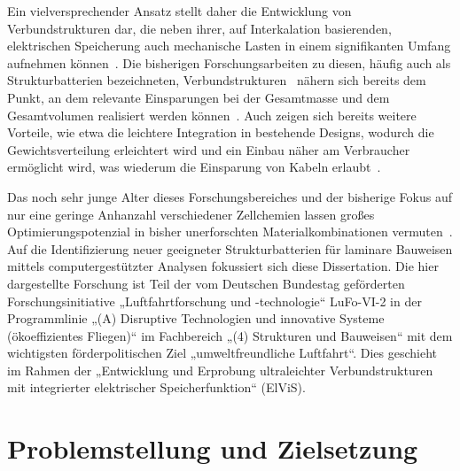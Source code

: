 Ein vielversprechender Ansatz stellt daher die Entwicklung von Verbundstrukturen dar, die neben ihrer, auf Interkalation basierenden, elektrischen Speicherung auch mechanische Lasten in einem signifikanten Umfang aufnehmen können~\cite{Wong2007,Carlson2013}. Die bisherigen Forschungsarbeiten zu diesen, häufig auch als Strukturbatterien bezeichneten, Verbundstrukturen~\cite{Johannisson2018,Liu2009,Ekstedt2010,Wang2019,Zhao2020,Yin2020,Lutkenhaus2020,Fu2021,Jin2021,Kalnaus2021} nähern sich bereits dem Punkt, an dem relevante Einsparungen bei der Gesamtmasse und dem Gesamtvolumen realisiert werden können~\cite{Wetzel2004,Snyder2015,Carlstedt2020a,Asp2014,Johannisson2019}. Auch zeigen sich bereits weitere Vorteile, wie etwa die leichtere Integration in bestehende Designs, wodurch die Gewichtsverteilung erleichtert wird und ein Einbau näher am Verbraucher ermöglicht wird, was wiederum die Einsparung von Kabeln erlaubt~\cite{Thomas2004,Danzi2021,Moyer2020,Wang2020}. %

Das noch sehr junge Alter dieses Forschungsbereiches und der bisherige Fokus auf nur eine geringe Anhanzahl verschiedener Zellchemien lassen großes Optimierungspotenzial in bisher unerforschten Materialkombinationen vermuten~\cite{Asp2019}. Auf die Identifizierung neuer geeigneter Strukturbatterien für laminare Bauweisen mittels computergestützter Analysen fokussiert sich diese Dissertation.
Die hier dargestellte Forschung ist Teil der vom Deutschen Bundestag geförderten Forschungsinitiative „Luftfahrtforschung und -technologie“ LuFo-VI-2 in der Programmlinie „(A) Disruptive Technologien und innovative Systeme (ökoeffizientes Fliegen)“ im Fachbereich „(4) Strukturen und Bauweisen“ mit dem wichtigsten förderpolitischen Ziel „umweltfreundliche Luftfahrt“. Dies geschieht im Rahmen der „Entwicklung und Erprobung ultraleichter Verbundstrukturen mit integrierter elektrischer Speicherfunktion“ (ElViS).


\section{\label{sec:Motivation_Zielstellung}Problemstellung und Zielsetzung}

